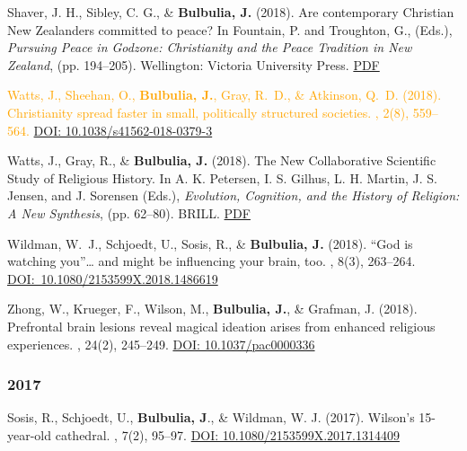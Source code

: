 \documentclass{article}
\begin{document}
\begin{thebibliography}{99}
Shaver, J. H., Sibley, C. G., \& {\bf Bulbulia, J.} (2018).
\newblock Are contemporary {C}hristian {N}ew {Z}ealanders committed to peace?
\newblock In Fountain, P. and Troughton, G., (Eds.), {\em Pursuing Peace in
  Godzone: Christianity and the Peace Tradition in New Zealand}, (pp. 194--205). Wellington: Victoria University Press.
\href{https://www.dropbox.com/s/2gklu6owh2yypgs/PPIGShaverBulbulia.pdf?dl=0}{PDF}


\textcolor{Orange}{Watts, J., Sheehan, O., {\bf Bulbulia, J.}, Gray, R.~D., \& Atkinson, Q.~D. (2018).
\newblock Christianity spread faster in small, politically structured societies.
, 2(8), 559--564.}
\href{https://doi.org/10.1038/s41562-018-0379-3}{DOI: 10.1038/s41562-018-0379-3}


Watts, J., Gray, R., \& {\bf Bulbulia, J.} (2018). 
\newblock The New Collaborative Scientific Study of Religious History. 
\newblock In A. K. Petersen, I. S. Gilhus, L. H. Martin, J. S. Jensen, and J. Sorensen (Eds.), {\em Evolution, Cognition, and the History of Religion: A New Synthesis}, (pp. 62--80). BRILL. 
\href{https://www.dropbox.com/s/wr5nq9ygiybspfp/WattsGrayAndBulbulia.pdf?dl=0}{PDF}


Wildman, W.~J., Schjoedt, U., Sosis, R., \& {\bf Bulbulia, J.} (2018).
\newblock ``God is watching you''{\ldots} and might be influencing your brain, too. 
, 8(3), 263--264.
\href{https://doi.org/10.1080/2153599X.2018.1486619}{DOI:~10.1080/2153599X.2018.1486619}


Zhong, W., Krueger, F., Wilson, M., {\bf Bulbulia, J.}, \& Grafman, J. (2018). 
\newblock Prefrontal brain lesions reveal magical ideation arises from enhanced religious experiences. 
, 24(2), 245--249. 
\href{http://dx.doi.org/10.1037/pac0000336}{DOI: 10.1037/pac0000336}



\subsubsection*{2017}


Sosis, R., Schjoedt, U., {\bf Bulbulia, J}., \& Wildman, W. J. (2017).
\newblock Wilson’s 15-year-old cathedral.
, 7(2), 95--97.
\href{https://doi.org/10.1080/2153599X.2017.1314409}{DOI: 10.1080/2153599X.2017.1314409}



\end{thebibliography}
\end{document}
